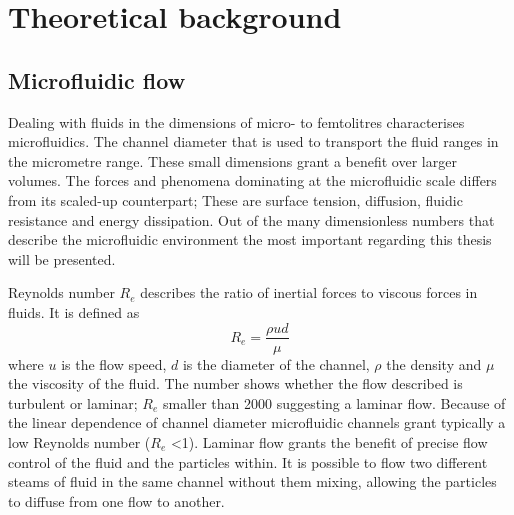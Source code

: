 \documentclass[final]{jyflluk}
\begin{document}
\section{Theoretical background}
\label{sec:theoretical_background}


\subsection{Microfluidic flow}
\label{sec:subsection1}

Dealing with fluids in the dimensions of micro- to femtolitres characterises microfluidics. The channel diameter that is used to transport the fluid ranges in the micrometre range. These small dimensions grant a benefit over larger volumes. The forces and phenomena dominating at the microfluidic scale differs from its scaled-up counterpart; These are surface tension, diffusion, fluidic resistance and energy dissipation. Out of the many dimensionless numbers that describe the microfluidic environment the most important regarding this thesis will be presented.

Reynolds number $R_e$ describes the ratio of inertial forces to viscous forces in fluids. It is defined as 
%
\begin{equation}
    \label{eq:Reynolds}
    R_e = \frac{\rho u d}{\mu}
 \end{equation}
where $u$ is the flow speed, $d$ is the diameter of the channel, $\rho$ the density and $\mu$ the viscosity of the fluid. The number shows whether the flow described is turbulent or laminar; $R_e$ smaller than 2000 suggesting a laminar flow. Because of the linear dependence of channel diameter microfluidic channels grant typically a low Reynolds number ($R_e$ <1). Laminar flow grants the benefit of precise flow control of the fluid and the particles within. It is possible to flow two different steams of fluid in the same channel without them mixing, allowing the particles to diffuse from one flow to another. \cite{tian2008introduction}
\end{document}
